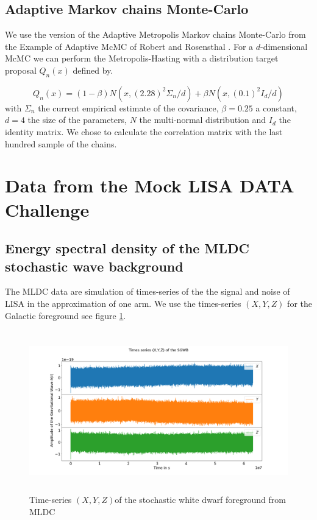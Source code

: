 \documentclass[a4paper,12pt]{article}
\begin{document}
\subsection{Adaptive Markov chains Monte-Carlo} \label{sec:adaptive}

We use the version of the Adaptive Metropolis Markov chains Monte-Carlo from the Example of Adaptive McMC of Robert and Rosensthal \cite{10.1198/jcgs.2009.06134}. For a $d$-dimensional McMC we can perform the Metropolis-Hasting with a distribution target proposal $Q_n(x)$ defined by.

\begin{equation}
    Q_n(x)= (1-\beta)N(x,(2.28)^2 \Sigma_n / d ) + \beta N(x,(0.1)^2 I_d/d)
\end{equation}
with $\Sigma_n$ the current empirical estimate of the covariance, $\beta = 0.25$ a constant, $d=4$ the size of the parameters, $N$ the multi-normal distribution and $I_d$ the identity matrix. We chose to calculate the correlation matrix with the last hundred sample of the chains. 


\section{Data from the Mock LISA DATA Challenge}

\subsection{Energy spectral density of the MLDC stochastic wave background}
The MLDC data are simulation of times-series of the the signal and noise of LISA in the approximation of one arm. We use the times-series $(X,Y,Z)$ for the Galactic foreground see figure \ref{fig:T-SXYZ}. 

\begin{figure}[H]
    \centering
    \includegraphics[height= 7cm]{multiplotXYZ.png}
    \caption{Time-series $(X,Y,Z)$of the stochastic white dwarf foreground from MLDC}
    \label{fig:T-SXYZ}
\end{figure}
\end{document}
